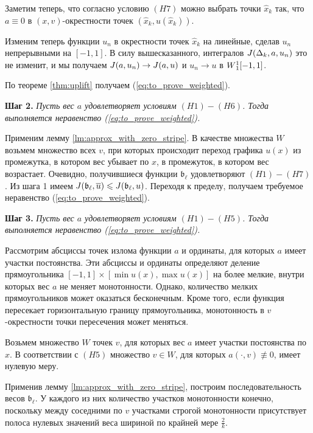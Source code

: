 Заметим теперь, что согласно условию $(H7)$ можно выбрать точки $\hat{x}_k$ так,
что $a \equiv 0$ в $(x, v)$-окрестности точек $(\hat{x}_k, u(\hat{x}_k))$.

Изменим теперь функции $u_n$ в окрестности точек $\hat{x}_k$ на линейные,
сделав $u_n$ непрерывными на $[-1, 1]$.
В силу вышесказанного, интегралов $J(\Delta_k, a, u_n)$ это не изменит,
и мы получаем $J(a, u_n) \to J(a, u)$ и $u_n \to u$ в $W{}_1^1[-1, 1]$.

По теореме \ref{thm:uplift} получаем (\ref{eq:to_prove_weighted}).

\bigskip

\textbf{Шаг 2.}
\textit{Пусть вес $a$ удовлетворяет условиям $(H1)-(H6)$.
Тогда выполняется неравенство (\ref{eq:to_prove_weighted}).}

Применим лемму \ref{lm:approx_with_zero_stripe}.
В качестве множества $W$ возьмем множество всех $v$,
при которых происходит переход графика $u(x)$ из промежутка,
в котором вес убывает по $x$, в промежуток, в котором вес возрастает.
Очевидно, получившиеся функции $\mathfrak b_{\ell}$ удовлетворяют $(H1)-(H7)$.
Из шага 1 имеем $\IWg(\mathfrak b_{\ell}, \mon{u}) \le \IWg(\mathfrak b_{\ell}, u)$.
Переходя к пределу, получаем требуемое неравенство (\ref{eq:to_prove_weighted}).

\bigskip

\textbf{Шаг 3.}
\textit{Пусть вес $a$ удовлетворяет условиям $(H1)-(H5)$.
Тогда выполняется неравенство (\ref{eq:to_prove_weighted}).}

Рассмотрим абсциссы точек излома функции $a$ и ординаты, для которых $a$ имеет участки постоянства.
Эти абсциссы и ординаты определяют деление прямоугольника $[-1, 1] \times [\min u(x), \max u(x)]$
на более мелкие, внутри которых вес $a$ не меняет монотонности.
Однако, количество мелких прямоугольников может оказаться бесконечным.
Кроме того, если функция пересекает горизонтальную границу прямоугольника,
монотонность в $v$-окрестности точки пересечения может меняться.

Возьмем множество $W$ точек $v$, для которых вес $a$ имеет участки постоянства по $x$.
В соответствии с $(H5)$ множество $v \in W$, для которых $a(\cdot, v) \not\equiv 0$, имеет нулевую меру.

Применив лемму \ref{lm:approx_with_zero_stripe}, построим последовательность весов $\mathfrak b_{\ell}$.
У каждого из них количество участков монотонности конечно,
поскольку между соседними по $v$ участками строгой монотонности
присутствует полоса нулевых значений веса шириной по крайней мере $\frac{2}{k}$.

